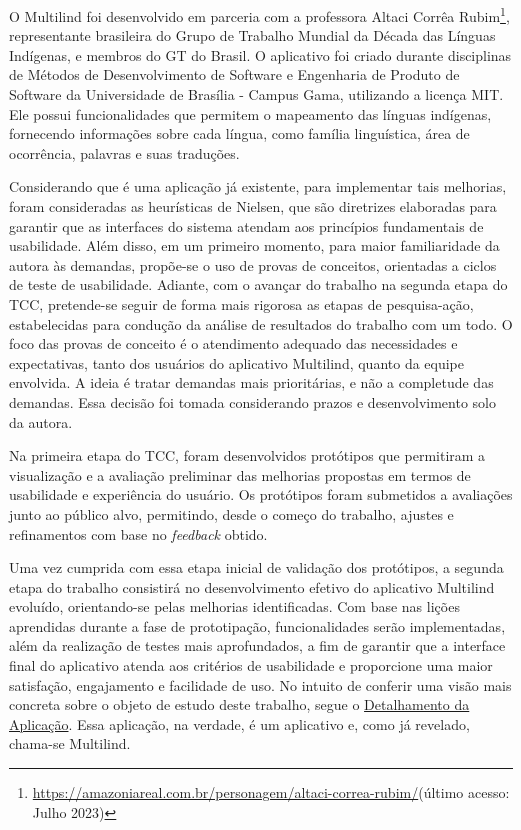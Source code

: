 O Multilind foi desenvolvido em parceria com a professora Altaci Corrêa Rubim\footnote{\url{https://amazoniareal.com.br/personagem/altaci-correa-rubim/}(último acesso: Julho 2023)}, representante brasileira do Grupo de Trabalho Mundial da Década das Línguas Indígenas, 
e membros do GT do Brasil. O aplicativo foi criado durante disciplinas de Métodos de Desenvolvimento de Software e Engenharia de Produto de Software da Universidade de Brasília - Campus Gama, utilizando a licença MIT. Ele possui funcionalidades que permitem o mapeamento 
das línguas indígenas, fornecendo informações sobre cada língua, como família linguística, área de ocorrência, palavras e suas traduções.

Considerando que é uma aplicação já existente, para implementar tais melhorias, foram consideradas as heurísticas de Nielsen, que são diretrizes elaboradas para garantir que as interfaces do sistema atendam aos princípios fundamentais de usabilidade. Além disso, em um 
primeiro momento, para maior familiaridade da autora às demandas, propõe-se o uso de provas de conceitos, orientadas a ciclos de teste de usabilidade. Adiante, com o avançar do trabalho na segunda etapa do TCC, pretende-se seguir de forma mais rigorosa as etapas de 
pesquisa-ação, estabelecidas para condução da análise de resultados do trabalho com um todo. O foco das provas de conceito é o atendimento adequado das necessidades e expectativas, tanto dos usuários do aplicativo Multilind, quanto da equipe envolvida. A ideia é tratar 
demandas mais prioritárias, e não a completude das demandas. Essa decisão foi tomada considerando prazos e desenvolvimento solo da autora.

Na primeira etapa do TCC, foram desenvolvidos protótipos que permitiram a visualização e a avaliação preliminar das melhorias propostas em termos de usabilidade e experiência do usuário. Os protótipos 
foram submetidos a avaliações junto ao público alvo, permitindo, desde o começo do trabalho, ajustes e refinamentos com base no \textit{feedback} obtido. 

Uma vez cumprida com essa etapa inicial de validação dos protótipos, a segunda etapa do trabalho consistirá no desenvolvimento efetivo do aplicativo Multilind evoluído, orientando-se pelas melhorias identificadas. Com base nas lições aprendidas durante a fase de prototipação, 
funcionalidades serão implementadas, além da realização de testes mais aprofundados, a fim de garantir que a interface final do aplicativo atenda aos critérios de usabilidade e proporcione uma maior satisfação, engajamento e facilidade de uso. No intuito de conferir uma visão 
mais concreta sobre o objeto de estudo deste trabalho, segue o \hyperref[sec:Detalhamento da Aplicacao]{Detalhamento da Aplicação}. Essa aplicação, na verdade, é um aplicativo e, como já revelado, chama-se Multilind.
	
